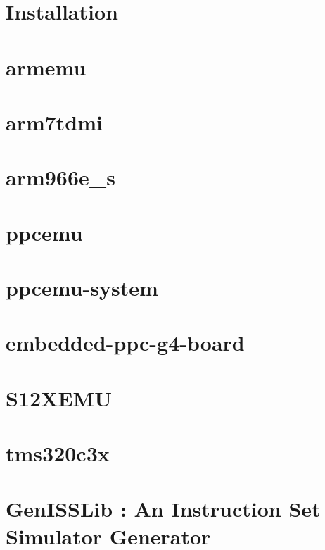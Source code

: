 \documentclass[a4paper,11pt,onecolumn]{mathese}
\begin{document}
\chapter{Installation}
\label{installation}


\chapter{armemu}
\label{armemu}


\chapter{arm7tdmi}
\label{arm7tdmi}


\chapter{arm966e\_s}
\label{arm966e_s}


\chapter{ppcemu}
\label{ppcemu}


\chapter{ppcemu-system}
\label{ppcemu_system}


\chapter{embedded-ppc-g4-board}
\label{embedded_ppc_g4_board}


\chapter{S12XEMU}
\label{S12XEMU}


\chapter{tms320c3x}
\label{tms320c3x}


\chapter{GenISSLib : An Instruction Set Simulator Generator}
\label{genisslib}

\end{document}
